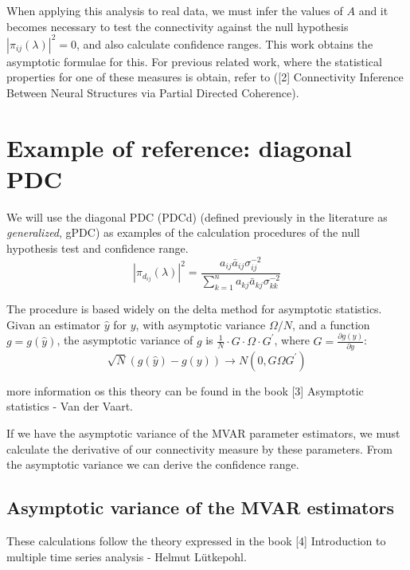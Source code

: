 \documentclass[a4paper,10pt]{article}
\begin{document}
When applying this analysis to real data, we must infer the values of $A$ and it becomes necessary to test the connectivity against the null hypothesis $ |\pi_{ij}(\lambda)|^{2} = 0$, and also calculate confidence ranges. This work obtains the asymptotic formulae for this. For previous related work, where the statistical properties for one of these measures is obtain, refer to ([2] Connectivity Inference Between Neural Structures via Partial Directed Coherence).

\section{Example of reference: diagonal PDC}

We will use the diagonal PDC (PDCd) (defined previously in the literature as \emph{generalized}, gPDC) as examples of the calculation procedures of the null hypothesis test and confidence range.
\begin{equation}
|\pi_{d_{ij}}(\lambda)|^{2} = \frac{a_{ij} \bar{a}_{ij} \sigma_{ij}^{-2}} {\sum_{k=1}^{n}{a_{kj} \bar{a}_{kj} \sigma_{kk}^{-2}}}
\end{equation}

The procedure is based widely on the delta method for asymptotic statistics. Givan an estimator $\hat{y}$ for $y$, with asymptotic variance $\Omega/N$, and a function $g = g(\hat{y})$, the asymptotic variance of $g$ is $\frac{1}{N} \cdot G \cdot \Omega \cdot G^{'}$, where $G = \frac{\partial g(y)}{\partial y}$:
\begin{equation} 
\sqrt{N} (g(\hat{y}) - g(y)) \to N(0, G \Omega G^{'})
\end{equation}

more information os this theory can be found in the book [3] Asymptotic statistics - Van der Vaart.

If we have the asymptotic variance of the MVAR parameter estimators, we must calculate the derivative of our connectivity measure by these parameters. From the asymptotic variance we can derive the confidence range.

\subsection{Asymptotic variance of the MVAR estimators}

These calculations follow the theory expressed in the book [4] Introduction to multiple time series analysis - Helmut Lütkepohl.
\end{document}
